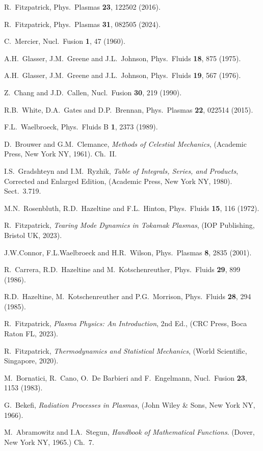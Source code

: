 \documentclass[12pt,prb,aps]{revtex4-1}
\begin{document}
\begin{thebibliography}{99}
 R.~Fitzpatrick, Phys.\ Plasmas {\bf 23}, 122502 (2016).

 R.~Fitzpatrick, Phys.\ Plasmas {\bf 31}, 082505 (2024).

 C.~Mercier, Nucl.\ Fusion {\bf 1}, 47 (1960).

 A.H.~Glasser, J.M.~Greene and J.L.~Johnson, Phys.\ Fluids {\bf 18}, 875 (1975).

 A.H.~Glasser, J.M.~Greene  and J.L.~Johnson, Phys.\ Fluids {\bf 19}, 567 (1976).

 Z.~Chang and J.D.~Callen,  Nucl.\ Fusion {\bf 30}, 219 (1990).

 R.B.~White, D.A.~Gates and D.P.~Brennan, Phys.\ Plasmas {\bf 22}, 022514 (2015). 

 F.L.~Waelbroeck, Phys.\ Fluids B {\bf 1}, 2373 (1989).

 D.~Brouwer and G.M.~Clemance, {\em Methods of Celestial Mechanics}, (Academic Press, New York NY, 1961).  Ch.~II.

 I.S.~Gradshteyn and I.M.~Ryzhik, {\em Table of Integrals, Series, and Products}, Corrected and Enlarged Edition, (Academic Press, New York NY, 1980). Sect.~3.719.

 M.N.~Rosenbluth, R.D.~Hazeltine and F.L.~Hinton, Phys.\ Fluids {\bf 15}, 116 (1972).

 R.~Fitzpatrick, {\em Tearing Mode Dynamics in Tokamak Plasmas}, (IOP Publishing, Bristol UK, 2023).

 J.W.Connor,  F.L.Waelbroeck and  H.R.~Wilson, Phys.\ Plasmas {\bf 8}, 2835 (2001). 

 R.~Carrera, R.D.~Hazeltine and M.~Kotschenreuther, Phys.\ Fluids {\bf 29}, 899 (1986). 

 R.D.~Hazeltine, M.~Kotschenreuther and P.G.~Morrison, Phys.\ Fluids {\bf 28}, 294 (1985). 

 R.~Fitzpatrick, {\em Plasma Physics: An Introduction}, 2nd Ed., (CRC Press, Boca Raton FL, 2023).

 R.~Fitzpatrick, {\em Thermodynamics and Statistical Mechanics}, (World Scientific, Singapore,  2020).

 M.~Bornatici, R.~Cano, O.\ De Barbieri and F.~Engelmann, Nucl.\ Fusion {\bf 23}, 1153 (1983).

 G.~Bekefi, {\em Radiation Processes in Plasmas}, (John Wiley \& Sons, New York NY, 1966).

 M.~Abramowitz and I.A.~Stegun, {\em Handbook of Mathematical Functions}. (Dover, New York NY, 1965.)  Ch.~7.

\end{thebibliography}
\end{document}
